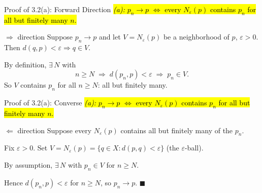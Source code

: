 \documentclass[aspectratio=169,12pt,t]{beamer}
\begin{document}
{%
\begin{frame}{Proof of 3.2(a): Forward Direction}
  \hl{\emph{(a):} $p_n \to p$ $\iff$ every $N_\varepsilon(p)$ contains $p_n$ for all but finitely many $n$.}

  \vspace{0.3em}
  \begin{proofblock}{$\Rightarrow$ direction}
    Suppose $p_n \to p$ and let $V = N_\varepsilon(p)$ be a neighborhood of $p$, $\varepsilon > 0$. \\
    Then $d(q,p) < \varepsilon \Rightarrow q \in V$.

    \vspace{0.3em}
    By definition, $\exists\, N$ with
    \[
      n \geq N \;\Longrightarrow\; d(p_n, p) < \varepsilon \;\Longrightarrow\; p_n \in V.
    \]
    So $V$ contains $p_n$ for all $n \geq N$: all but finitely many.
  \end{proofblock}

\end{frame}

\begin{frame}{Proof of 3.2(a): Converse}
  \hl{\emph{(a):} $p_n \to p$ $\iff$ every $N_\varepsilon(p)$ contains $p_n$ for all but finitely many $n$.}

  \vspace{0.3em}
  \begin{proofblock}{$\Leftarrow$ direction}
    Suppose every $N_\varepsilon(p)$ contains all but finitely many of the $p_n$.

    \vspace{0.3em}
    Fix $\varepsilon > 0$. Set $V = N_\varepsilon(p) = \{q \in X : d(p,q) < \varepsilon\}$ (the $\varepsilon$-ball).

    \vspace{0.3em}
    By assumption, $\exists\, N$ with $p_n \in V$ for $n \geq N$.

    \vspace{0.3em}
    Hence $d(p_n, p) < \varepsilon$ for $n \geq N$, so $p_n \to p$. \quad $\blacksquare$
  \end{proofblock}


\end{frame}}
\end{document}
